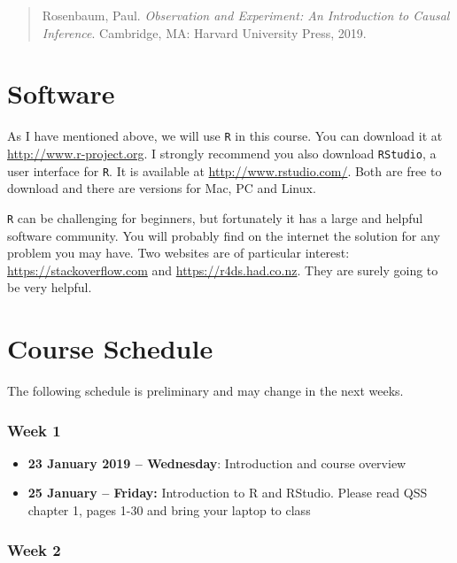 \documentclass[a4paper,12pt]{article}
\begin{document}
\begin{quote}
Rosenbaum, Paul. \textit{Observation and Experiment: An Introduction to Causal Inference}. Cambridge, MA: Harvard University Press, 2019.
\end{quote}



\section{Software}%
\label{sec:software}

As I have mentioned above, we will use \texttt{R} in this course. You can download it at \href{http://www.r-project.org}{http://www.r-project.org}. I strongly recommend you also download \texttt{RStudio}, a user interface for \texttt{R}. It is available at \href{http://www.rstudio.com/}{http://www.rstudio.com/}. Both are free to download and there are versions for Mac, PC and Linux.

\texttt{R} can be challenging for beginners, but fortunately it has a large and helpful software community. You will probably find on the internet the solution for any problem you may have. Two websites are of particular interest: \href{https://stackoverflow.com}{https://stackoverflow.com} and \href{https://r4ds.had.co.nz}{https://r4ds.had.co.nz}. They are surely going to be very helpful. 

\section{Course Schedule}%
\label{sec:course_schedule}

The following schedule is preliminary and may change in the next weeks. 

\subsubsection*{Week 1}

\begin{itemize}
	\item \textbf{23 January 2019 -- Wednesday}: Introduction and course overview
	\item \textbf{25 January -- Friday:} Introduction to R and RStudio. Please read QSS chapter 1, pages 1-30 and bring your laptop to class
\end{itemize}

\subsubsection*{Week 2}
\end{document}
